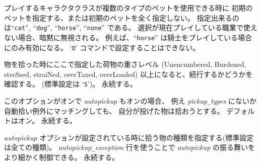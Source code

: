 プレイするキャラクタクラスが複数のタイプのペットを使用できる時に
初期のペットを指定する、または初期のペットを全く指定しない。
指定出来るのは``{\tt cat}'', ``{\tt dog}'', ``{\tt horse}'', ``{\tt none}'' である。
選択が現在プレイしている職業で使えない場合、暗黙に無視される。
例えば、``{\tt horse}'' は騎士をプレイしている場合にのみ有効になる。
`{\tt O}' コマンドで設定することはできない。
\item[\ib{pickup\verb+_+burden}]
物を拾った時にここで指定した荷物の重さレベル
(Unencumbered, Burdened, streSsed, straiNed, overTaxed, overLoaded)
以上になると、続行するかどうかを確認する。
(標準設定は `{\tt S}')。
永続する。
\item[\ib{pickup\verb+_+thrown}]
このオプションがオンで
{\it autopickup\/}
もオンの場合、
例え
{\it pickup\verb+_+types\/}
にないか自動拾い例外にマッチングしても、
自分が投げた物は拾おうとする。
デフォルトはオン。
永続する。
\item[\ib{pickup\verb+_+types}]
{\it autopickup\/}
オプションが設定されている時に拾う物の種類を指定する(標準設定は全ての種類)。
{\it autopickup\verb+_+exception\/}
行を使うことで
{\it autopickup\/}
の振る舞いをより細かく制御できる。
永続する。
\item[\ib{pile\verb+_+limit}]

